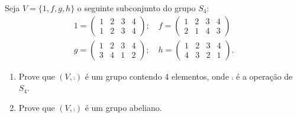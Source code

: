 \documentclass[12pt]{exam}
\begin{document}
    \vspace{.3cm}

    \questao{} Seja $V = \{1, f, g, h\}$ o seguinte subconjunto do grupo $S_4$:
    \begin{align*}
        1 = \begin{pmatrix}
            1 & 2 & 3 & 4\\
            1 & 2 & 3 & 4
        \end{pmatrix}; \quad f = \begin{pmatrix}
            1 & 2 & 3 & 4\\
            2 & 1 & 4 & 3
        \end{pmatrix}\\
        g = \begin{pmatrix}
            1 & 2 & 3 & 4\\
            3 & 4 & 1 & 2
        \end{pmatrix}; \quad h = \begin{pmatrix}
            1 & 2 & 3 & 4\\
            4 & 3 & 2 & 1
        \end{pmatrix}.
    \end{align*}
    \begin{enumerate}[label=({\alph*})]
        \item Prove que $(V, \comp)$ é um grupo contendo 4 elementos, onde $\comp$ é a operação de $S_4$.

        \item Prove que $(V, \comp)$ é um grupo abeliano.
    \end{enumerate}

    \vspace{.3cm}
\end{document}
